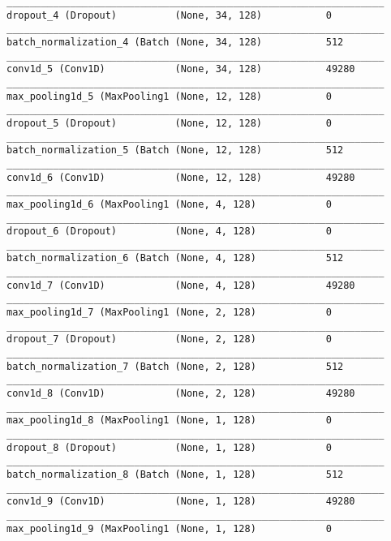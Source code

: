 {\begin{verbatim}
_________________________________________________________________
dropout_4 (Dropout)          (None, 34, 128)           0         
_________________________________________________________________
batch_normalization_4 (Batch (None, 34, 128)           512       
_________________________________________________________________
conv1d_5 (Conv1D)            (None, 34, 128)           49280     
_________________________________________________________________
max_pooling1d_5 (MaxPooling1 (None, 12, 128)           0         
_________________________________________________________________
dropout_5 (Dropout)          (None, 12, 128)           0         
_________________________________________________________________
batch_normalization_5 (Batch (None, 12, 128)           512       
_________________________________________________________________
conv1d_6 (Conv1D)            (None, 12, 128)           49280     
_________________________________________________________________
max_pooling1d_6 (MaxPooling1 (None, 4, 128)            0         
_________________________________________________________________
dropout_6 (Dropout)          (None, 4, 128)            0         
_________________________________________________________________
batch_normalization_6 (Batch (None, 4, 128)            512       
_________________________________________________________________
conv1d_7 (Conv1D)            (None, 4, 128)            49280     
_________________________________________________________________
max_pooling1d_7 (MaxPooling1 (None, 2, 128)            0         
_________________________________________________________________
dropout_7 (Dropout)          (None, 2, 128)            0         
_________________________________________________________________
batch_normalization_7 (Batch (None, 2, 128)            512       
_________________________________________________________________
conv1d_8 (Conv1D)            (None, 2, 128)            49280     
_________________________________________________________________
max_pooling1d_8 (MaxPooling1 (None, 1, 128)            0         
_________________________________________________________________
dropout_8 (Dropout)          (None, 1, 128)            0         
_________________________________________________________________
batch_normalization_8 (Batch (None, 1, 128)            512       
_________________________________________________________________
conv1d_9 (Conv1D)            (None, 1, 128)            49280     
_________________________________________________________________
max_pooling1d_9 (MaxPooling1 (None, 1, 128)            0         

\end{verbatim}}
